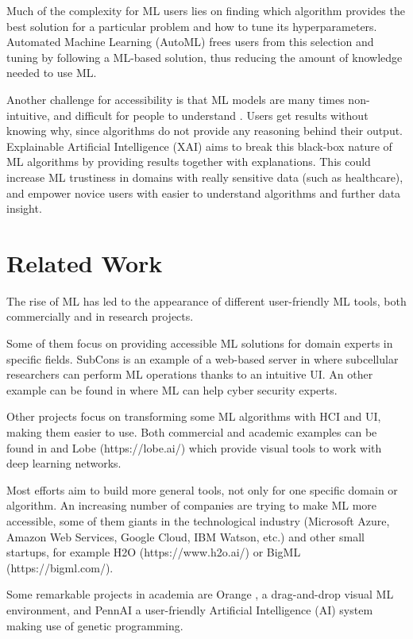 \documentclass[runningheads]{llncs}
\begin{document}
Much of the complexity for ML users lies on finding which algorithm provides the best solution for a particular problem and how to tune its hyperparameters. Automated Machine Learning (AutoML) frees users from this selection and tuning \cite{4} by following a ML-based solution, thus reducing the amount of knowledge needed to use ML.

Another challenge for accessibility is that ML models are many times non-intuitive, and difficult for people to understand \cite{5}. 
Users get results without knowing why, since algorithms do not provide any reasoning behind their output. Explainable Artificial Intelligence (XAI) aims to break this black-box nature of ML algorithms by providing results together with explanations. This could increase ML trustiness in domains with really sensitive data (such as healthcare), and empower novice users with easier to understand algorithms and further data insight.

\section{Related Work}

The rise of ML has led to the appearance of different user-friendly ML tools, both commercially and in research projects. 

Some of them focus on providing accessible ML solutions for domain experts in specific fields. 
SubCons \cite{subcons} is an example of a web-based server in where subcellular researchers can perform ML operations thanks to an intuitive UI. 
An other example can be found in \cite{cyber} where ML can help cyber security experts.

Other projects focus on transforming some ML algorithms with HCI and UI, making them easier to use. Both commercial and academic examples can be found in \cite{Barista} and Lobe (https://lobe.ai/) which provide visual tools to work with deep learning networks.

Most efforts aim to build more general tools, not only for one specific domain or algorithm.
An increasing number of companies are trying to make ML more accessible, some of them giants in the technological industry (Microsoft Azure, Amazon Web Services, Google Cloud, IBM Watson, etc.) and 
other small startups, for example H2O (https://www.h2o.ai/) or BigML (https://bigml.com/).

Some remarkable projects in academia are Orange \cite{orange}, a drag-and-drop visual ML environment, and PennAI \cite{pennAI} a user-friendly Artificial Intelligence (AI) system making use of genetic programming.
\end{document}
